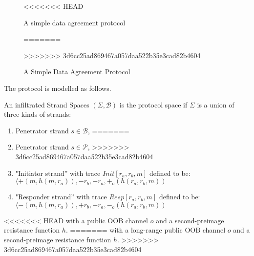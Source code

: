 \begin{figure}[b]
\begin{center}
\end{center}
<<<<<<< HEAD
\caption{A simple data agreement protocol} 
=======
\caption{A Simple Data Agreement Protocol} 
>>>>>>> 3d6cc25ad869467a057daa522b35e3cad82b4604
\label{dataagreel}
\end{figure}

The protocol is modelled as follows. 

\begin{Definition}
An infiltrated Strand Spaces $(\Sigma,\mathcal{B})$ is the protocol space if $\Sigma$ is a union of three kinds of strands:
\begin{enumerate}
<<<<<<< HEAD
\item Penetrator strand $s \in \mathcal{B}$,
=======
\item Penetrator strand $s \in \mathcal{P}$,
>>>>>>> 3d6cc25ad869467a057daa522b35e3cad82b4604
\item "Initiator strand'' with trace {\small $Init[r_a,r_b,m]$} defined to be: \\ 
 {\small $\langle +(m,h(m,r_a)),-r_b,+r_a,+_o(h(r_a,r_b,m))$}
\item "Responder strand'' with trace {\small $Resp[r_a,r_b,m]$} defined to be: \\ 
 {\small $\langle -(m,h(m,r_a)),+r_b,-r_a,-_o(h(r_a,r_b,m))$}
\end{enumerate}
<<<<<<< HEAD
with a public OOB channel $o$ and a second-preimage resistance function $h$. 
=======
with a long-range public OOB channel $o$ and a second-preimage resistance function $h$. 
>>>>>>> 3d6cc25ad869467a057daa522b35e3cad82b4604
\end{Definition}

